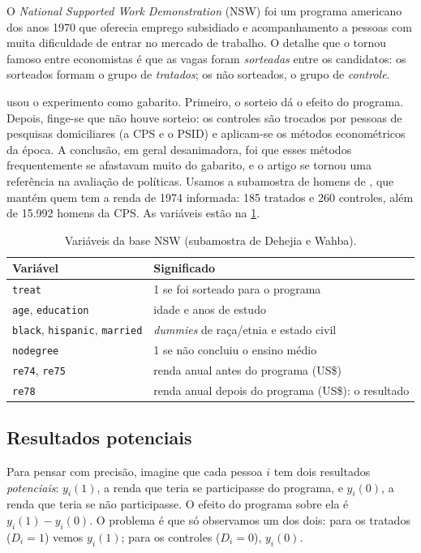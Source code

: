 O \emph{National Supported Work Demonstration} (NSW) foi um programa americano
dos anos 1970 que oferecia emprego subsidiado e acompanhamento a pessoas com
muita dificuldade de entrar no mercado de trabalho. O detalhe que o tornou
famoso entre economistas é que as vagas foram \emph{sorteadas} entre os
candidatos: os sorteados formam o grupo de \emph{tratados}; os não sorteados,
o grupo de \emph{controle}.

\textcite{lalonde1986} usou o experimento como gabarito. Primeiro, o sorteio dá
o efeito do programa. Depois, finge-se que não houve sorteio: os controles são
trocados por pessoas de pesquisas domiciliares (a CPS e o PSID) e aplicam-se os
métodos econométricos da época. A conclusão, em geral desanimadora, foi que
esses métodos frequentemente se afastavam muito do gabarito, e o artigo se
tornou uma referência na avaliação de políticas. Usamos a subamostra de homens
de \textcite{dehejia1999}, que mantém quem tem a renda de 1974 informada: 185
tratados e 260 controles, além de 15.992 homens da CPS. As variáveis estão na
\cref{tab:a02-variaveis}.

\begin{table}[ht]
  \centering\small
  \caption{Variáveis da base NSW (subamostra de Dehejia e Wahba).}
  \label{tab:a02-variaveis}
  \begin{tabular}{@{}ll@{}}
    \toprule
    Variável & Significado \\
    \midrule
    \texttt{treat} & 1 se foi sorteado para o programa \\
    \texttt{age}, \texttt{education} & idade e anos de estudo \\
    \texttt{black}, \texttt{hispanic}, \texttt{married} & \emph{dummies} de raça/etnia e estado civil \\
    \texttt{nodegree} & 1 se não concluiu o ensino médio \\
    \texttt{re74}, \texttt{re75} & renda anual antes do programa (US\$) \\
    \texttt{re78} & renda anual depois do programa (US\$): o resultado \\
    \bottomrule
  \end{tabular}
\end{table}

\subsection{Resultados potenciais}

Para pensar com precisão, imagine que cada pessoa $i$ tem dois resultados
\emph{potenciais}: $y_i(1)$, a renda que teria se participasse do programa, e
$y_i(0)$, a renda que teria se não participasse. O efeito do programa sobre
ela é $y_i(1) - y_i(0)$. O problema é que só observamos um dos dois: para os
tratados ($D_i = 1$) vemos $y_i(1)$; para os controles ($D_i = 0$), $y_i(0)$.

